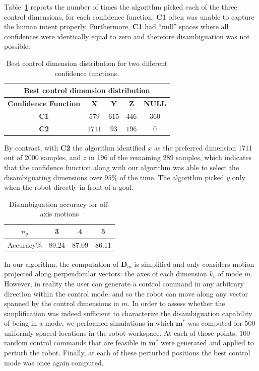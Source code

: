 \documentclass[conference]{IEEEtran}
\begin{document}
Table~\ref{HMD} reports the number of times the algorithm picked each of the three control dimensions, for each confidence function.  
\textbf{C1} often was unable to capture the human intent properly. Furthermore, \textbf{C1} had ``null'' spaces where all confidences were identically equal to zero and therefore disambiguation was not possible.  
\begin{table}[t]
	\centering
	\begin{tabular}{|c|c|c|c|c|}
		\hline
		\multicolumn{5}{|c|}{Best control dimension distribution} \\
		\hline
		\textbf{Confidence Function} & \textbf{X} & \textbf{Y} & \textbf{Z} & \textbf{NULL} \\ \hline
		
		\textbf{C1} & $579$ & $615$ & $446$ & $360$ \\ \hline
		\textbf{C2} & $1711$ & $93$ & $196$ & $0$\\ \hline
		
	\end{tabular}
	\vspace{.2cm}
	\caption{Best control dimension distribution for two different confidence functions.} 
	\label{HMD}
	\vspace{-.5cm}
\end{table}

By contrast, with \textbf{C2} the algorithm identified $x$ as the preferred dimension 1711 out of 2000 samples, and $z$ in 196 of the remaining 289 samples, which indicates that the confidence function along with our algorithm was able to select the disambiguating dimensions over $95\%$ of the time. The algorithm picked $y$ only when the robot directly in front of a goal. 
\begin{table}[h]
	\centering
	\begin{tabular}{|c|c|c|c|}
		\hline
		$n_g$ & 3 & 4 & 5 \\
		\hline
		Accuracy\% & 89.24 & 87.09 & 86.11 \\
		\hline
	\end{tabular}
	\vspace{.2cm}
	\caption{Disambiguation accuracy for off-axis motions} 
	\label{SIM}
	\vspace{-.5cm}
\end{table}

 In our algorithm, the computation of $\boldsymbol{D}_{m}$ is simplified and only considers motion projected along perpendicular vectors: the axes of each dimension $k_i$ of mode $m$. However, in reality the user can generate a control command in any arbitrary direction within the control mode, and so the robot can move along any vector spanned by the control dimensions in $m$. In order to assess whether the simplification was indeed sufficient to characterize the disambiguation capability of being in a mode, we performed simulations in which $\boldsymbol{m}^*$ was computed for $500$ uniformly spaced locations in the robot workspace. At each of those points, $100$ random control commands that are feasible in $\boldsymbol{m}^*$ were generated and applied to perturb the robot. Finally, at each of these perturbed positions the best control mode was once again computed. 
\end{document}

